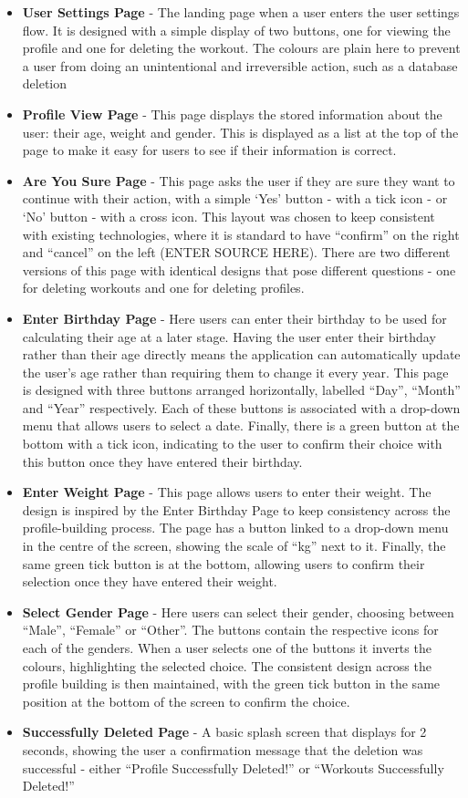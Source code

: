 \documentclass{l4proj}
\begin{document}
\begin{itemize}
    \item \textbf{User Settings Page} - The landing page when a user enters the user settings flow. It is designed with a simple display of two buttons, one for viewing the profile and one for deleting the workout. The colours are plain here to prevent a user from doing an unintentional and irreversible action, such as a database deletion
    \item \textbf{Profile View Page} - This page displays the stored information about the user: their age, weight and gender. This is displayed as a list at the top of the page to make it easy for users to see if their information is correct.
    \item \textbf{Are You Sure Page} - This page asks the user if they are sure they want to continue with their action, with a simple ‘Yes’ button - with a tick icon - or ‘No’ button - with a cross icon. This layout was chosen to keep consistent with existing technologies, where it is standard to have “confirm” on the right and “cancel” on the left (ENTER SOURCE HERE). There are two different versions of this page with identical designs that pose different questions - one for deleting workouts and one for deleting profiles.
    \item \textbf{Enter Birthday Page} - Here users can enter their birthday to be used for calculating their age at a later stage. Having the user enter their birthday rather than their age directly means the application can automatically update the user’s age rather than requiring them to change it every year. This page is designed with three buttons arranged horizontally, labelled “Day”, “Month” and “Year” respectively. Each of these buttons is associated with a drop-down menu that allows users to select a date. Finally, there is a green button at the bottom with a tick icon, indicating to the user to confirm their choice with this button once they have entered their birthday.
    \item \textbf{Enter Weight Page} - This page allows users to enter their weight. The design is inspired by the Enter Birthday Page to keep consistency across the profile-building process. The page has a button linked to a drop-down menu in the centre of the screen, showing the scale of “kg” next to it. Finally, the same green tick button is at the bottom, allowing users to confirm their selection once they have entered their weight.
    \item \textbf{Select Gender Page} - Here users can select their gender, choosing between “Male”, “Female” or “Other”. The buttons contain the respective icons for each of the genders. When a user selects one of the buttons it inverts the colours, highlighting the selected choice. The consistent design across the profile building is then maintained, with the green tick button in the same position at the bottom of the screen to confirm the choice.
    \item \textbf{Successfully Deleted Page} - A basic splash screen that displays for 2 seconds, showing the user a confirmation message that the deletion was successful - either “Profile Successfully Deleted!” or “Workouts Successfully Deleted!”
\end{itemize}
\end{document}
